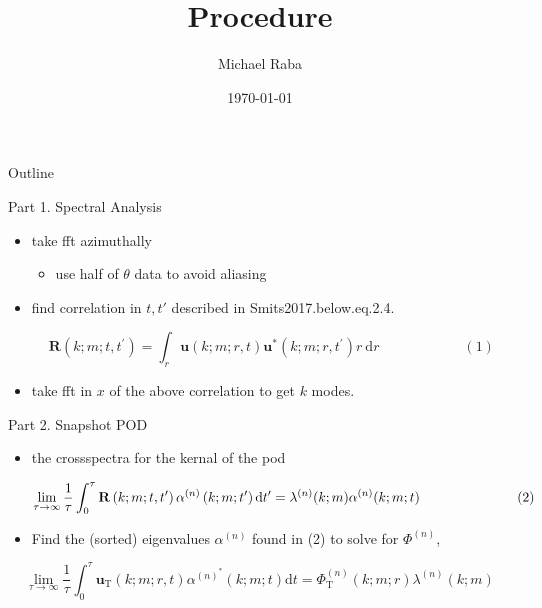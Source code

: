 \documentclass[presentation]{beamer}
\author{Michael Raba}
\date{\today}
\title{Procedure}
\begin{document}
\maketitle
\begin{frame}{Outline}
\tableofcontents
\end{frame}


\begin{frame}[label={sec:orgbef99fb}]{Part 1. Spectral Analysis}
\begin{itemize}
\item take fft azimuthally
\begin{itemize}
\item use half of \(\theta\) data to avoid aliasing
\end{itemize}
\item find correlation in \(t,t'\) described in Smits2017.below.eq.2.4.

$$\mathbf{R}\left(k ; m ; t, t^{\prime}\right)=\int_{r} \mathbf{u}(k ; m ; r, t) \mathbf{u}^{*}\left(k ; m ; r, t^{\prime}\right) r \mathrm{~d} r \hspace{1in} (1)$$
\item take fft in \(x\) of the above correlation to get \(k\) modes.
\end{itemize}
\end{frame}

\begin{frame}[label={sec:org61b63c5}]{Part 2. Snapshot POD}
\begin{itemize}
\item the crossspectra for the kernal of the pod

$$\lim_{\tau \rightarrow \infty} \frac{1}{\tau} \int_{0}^{\tau} \mathbf{R}\left(k ; m ; t, t^{\prime}\right) \alpha^{(n)}\left(k ; m ; t^{\prime}\right) \mathrm{d} t^{\prime}=\lambda^{(n)}(k ; m) \alpha^{(n)}(k ; m ; t)\hspace{1 in} (2)$$

\item Find the (sorted) eigenvalues \(\alpha^{(n)}\) found in (2) to solve for \(\Phi^{(n)}\),
\end{itemize}

$$\lim_{\tau \rightarrow \infty} \frac{1}{\tau} \int_{0}^{\tau}\mathbf{u}_{\mathrm{T}}(k ; m ; r, t)\alpha^{(n)^{*}}(k ; m ; t)\mathrm{d} t=\Phi_{\mathrm{T}}^{(n)}(k ; m ; r) \lambda^{(n)}(k ; m)$$
\end{frame}
\end{document}

